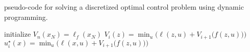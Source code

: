 \begin{algorithm}[bt]
	\caption{pseudo-code for solving a discretized optimal control problem using dynamic programming.}\label{alg:dynamicprogramming}
	\begin{algorithmic}
		\State initialize $V_n(x_N) = \ell_f(x_N)$ 
		\State
			\State $V_i(z) = \min_u \big(\ell(z,u) + V_{i+1}(f${{\footnotesize $(z,u)$}}$)\big)$
		\EndFor
		\State
		 
		\State $u^\star_i(x) = \min_u\big(\ell(x,u) + V_{i+1}(f${{\footnotesize $(z,u)$}}$)\big)$
		\EndFor
	\end{algorithmic}
\end{algorithm}